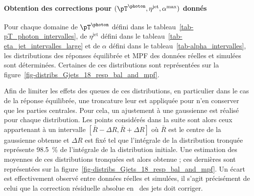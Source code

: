 \paragraph{Obtention des corrections pour $(\pT^{\photon}, \eta^\text{jet}, \alpha^\text{max})$ donnés}
Pour chaque domaine
de $\pT^{\photon}$ défini dans le tableau~\ref{tab-pT_photon_intervalles},
de $\eta^\text{jet}$ défini dans le tableau~\ref{tab-eta_jet_intervalles_large} et
de $\alpha$ défini dans le tableau~\ref{tab-alpha_intervalles},
les distributions des réponses équilibrée et MPF des données réelles et simulées sont déterminées.
Certaines de ces distributions sont représentées sur la figure~\ref{fig-distribs_Gjets_18_resp_bal_and_mpf}.
\par Afin de limiter les effets des queues de ces distributions, en particulier dans le cas de la réponse équilibrée,
une troncature leur est appliquée pour n'en conserver que les parties centrales.
Pour cela, un ajustement à une gaussienne est réalisé pour chaque distribution.
Les points considérés dans la suite sont alors ceux appartenant à un intervalle  $[ \bar{R} - \Delta R, \bar{R} + \Delta R ]$ où $\bar{R}$ est le centre de la gaussienne obtenue et $\Delta R$ est fixé tel que l'intégrale de la distribution tronquée représente \SI{98.5}{\%} de l'intégrale de la distribution initiale.
Une estimation des moyennes de ces distributions tronquées est alors obtenue ; ces dernières sont représentées sur la figure~\ref{fig-distribs_Gjets_18_resp_bal_and_mpf}.
Un écart est effectivement observé entre données réelles et simulées,
il s'agit précisément de celui que la correction résiduelle absolue en \pT\ des jets doit corriger.
